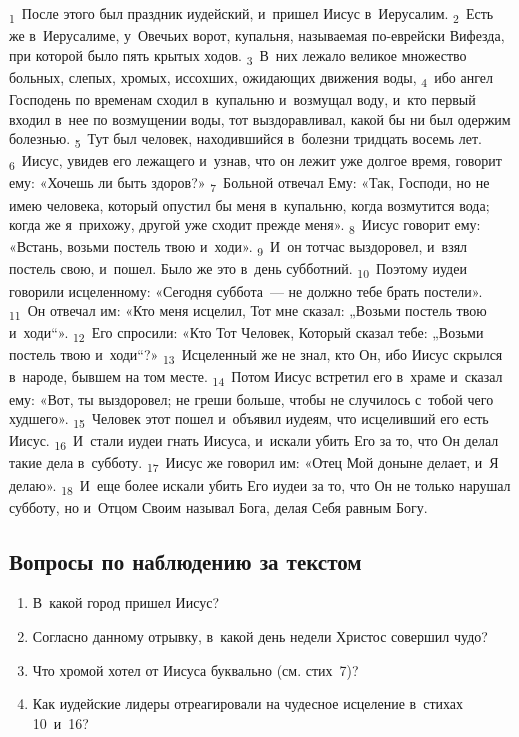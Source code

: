 \documentclass[a4paper,12pt]{article}
\begin{document}
\textsubscript{1}~После этого был праздник иудейский, и~пришел Иисус в~Иерусалим. \textsubscript{2}~Есть же в~Иерусалиме, у~Овечьих ворот, купальня, называемая по-еврейски Вифезда, при которой было пять крытых ходов. \textsubscript{3}~В~них лежало великое множество больных, слепых, хромых, иссохших, ожидающих движения воды, \textsubscript{4}~ибо ангел Господень по временам сходил в~купальню и~возмущал воду, и~кто первый входил в~нее по возмущении воды, тот выздоравливал, какой бы ни был одержим болезнью. \textsubscript{5}~Тут был человек, находившийся в~болезни тридцать восемь лет. \textsubscript{6}~Иисус, увидев его лежащего и~узнав, что он лежит уже долгое время, говорит ему: «Хочешь ли быть здоров?» \textsubscript{7}~Больной отвечал Ему: «Так, Господи, но не имею человека, который опустил бы меня в~купальню, когда возмутится вода; когда же я~прихожу, другой уже сходит прежде меня». \textsubscript{8}~Иисус говорит ему: «Встань, возьми постель твою и~ходи». \textsubscript{9}~И~он тотчас выздоровел, и~взял постель свою, и~пошел. Было же это в~день субботний. \textsubscript{10}~Поэтому иудеи говорили исцеленному: «Сегодня суббота~--- не должно тебе брать постели». \textsubscript{11}~Он отвечал им: «Кто меня исцелил, Тот мне сказал: „Возьми постель твою и~ходи“». \textsubscript{12}~Его спросили: «Кто Тот Человек, Который сказал тебе: „Возьми постель твою и~ходи“?» \textsubscript{13}~Исцеленный же не знал, кто Он, ибо Иисус скрылся в~народе, бывшем на том месте. \textsubscript{14}~Потом Иисус встретил его в~храме и~сказал ему: «Вот, ты выздоровел; не греши больше, чтобы не случилось с~тобой чего худшего». \textsubscript{15}~Человек этот пошел и~объявил иудеям, что исцеливший его есть Иисус. \textsubscript{16}~И~стали иудеи гнать Иисуса, и~искали убить Его за то, что Он делал такие дела в~субботу. \textsubscript{17}~Иисус же говорил им: «Отец Мой доныне делает, и~Я делаю». \textsubscript{18}~И~еще более искали убить Его иудеи за то, что Он не только нарушал субботу, но и~Отцом Своим называл Бога, делая Себя равным Богу. 

\subsection*{Вопросы по наблюдению за текстом}
\begin{enumerate}
    \item В~какой город пришел Иисус? 
    
    \myline
    
    \item Согласно данному отрывку, в~какой день недели Христос совершил чудо? 
    
    \myline
    \item Что хромой хотел от Иисуса буквально (см. стих~7)? 
    
    \myline
    
    \myline
    \item Как иудейские лидеры отреагировали на чудесное исцеление в~стихах 10~и~16? 
    
    \myline
    
    \myline
\end{enumerate}
\end{document}
